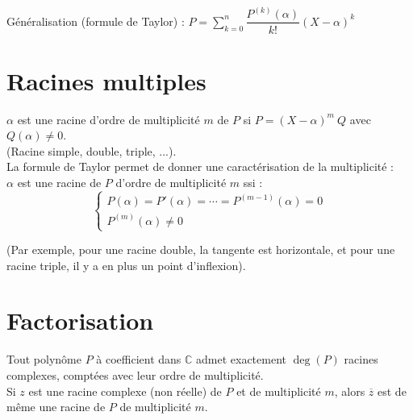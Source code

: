 \documentclass[13pt, twoside, a4paper, french]{report}
\begin{document}
    Généralisation (formule de Taylor) : $\displaystyle P = \sum^n_{k=0} \dfrac{P^{(k)}(\alpha)}{k!} (X-\alpha)^k$
  
  
  \section{Racines multiples}\label{sec:racines-multiples}
    
    $\alpha$ est une racine d'ordre de multiplicité $m$ de $P$ si $P = (X - \alpha)^m\ Q$ avec $Q(\alpha) \neq 0$.\\
    (Racine simple, double, triple, ...).\\
    
    La formule de Taylor permet de donner une caractérisation de la multiplicité :\\
    $\alpha$ est une racine de $P$ d'ordre de multiplicité $m$ ssi :
    \begin{equation}
      \label{eq:equation}
      \begin{cases}
        P(\alpha) = P'(\alpha) = \cdots = P^{(m-1)}(\alpha) = 0\\
        P^{(m)}(\alpha) \neq 0
      \end{cases}
    \end{equation}
    
    (Par exemple, pour une racine double, la tangente est horizontale, et pour une racine triple, il y a en plus un point d'inflexion).
    
    
  \section{Factorisation}\label{sec:factorisation}

    Tout polynôme $P$ à coefficient dans $\mathbb{C}$ admet exactement $\deg(P)$ racines complexes, comptées avec leur ordre de multiplicité.\\
    
    Si $z$ est une racine complexe (non réelle) de $P$ et de multiplicité $m$, alors $\overline{z}$ est de même une racine de $P$ de multiplicité $m$.\\
\end{document}

